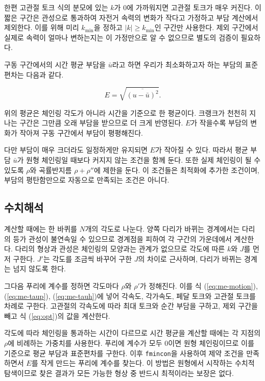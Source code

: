 한편 고관절 토크 식의 분모에 있는 \(k\)가 0에 가까워지면 고관절 토크가 매우 커진다. 이 짧은 구간은 관성으로 통과하여 자전거 속력의 변화가 작다고 가정하고 부담 계산에서 제외한다. 이를 위해 미리 \(k_{\min}\)을 정하고 \(|k|\geq k_{\min}\)인 구간만 사용한다. 제외 구간에서 실제로 속력이 얼마나 변하는지는 이 가정만으로 알 수 없으므로 별도의 검증이 필요하다.

구동 구간에서의 시간 평균 부담을 \(\bar{u}\)라고 하면 우리가 최소화하고자 하는 부담의 표준편차는 다음과 같다.

\begin{equation}
E=\sqrt{\overline{(u-\bar{u})^2}}.
\label{eq:opt}
\end{equation}

위의 평균은 체인링 각도가 아니라 시간을 기준으로 한 평균이다. 크랭크가 천천히 지나는 구간은 그만큼 오래 부담을 받으므로 더 크게 반영된다. \(E\)가 작을수록 부담의 변화가 작아져 구동 구간에서 부담이 평평해진다.

다만 부담이 매우 크더라도 일정하게만 유지되면 \(E\)가 작아질 수 있다. 따라서 평균 부담 \(\bar{u}\)가 원형 체인링일 때보다 커지지 않는 조건을 함께 둔다. 또한 실제 체인링이 될 수 있도록 \(\rho\)와 곡률반지름 \(\rho+\rho''\)에 제한을 둔다. 이 조건들은 최적화에 추가한 조건이며, 부담의 평탄함만으로 자동으로 만족되는 조건은 아니다.


\subsection{수치해석}

계산할 때에는 한 바퀴를 \(N\)개의 각도로 나눈다. 양쪽 다리가 바뀌는 경계에서는 다리의 등가 관성이 불연속일 수 있으므로 경계점을 피하여 각 구간의 가운데에서 계산한다. 다리의 형상과 관성은 체인링의 모양과는 관계가 없으므로 각도에 따른 \(k\)와 \(J\)를 먼저 구한다. \(J'\)는 각도를 조금씩 바꾸어 구한 \(J\)의 차이로 근사하며, 다리가 바뀌는 경계는 넘지 않도록 한다.

그다음 푸리에 계수를 정하면 각도마다 \(\rho\)와 \(\rho'\)가 정해진다. 이를 식 (\ref{eq:me-motion}), (\ref{eq:me-taup}), (\ref{eq:me-tauh})에 넣어 각속도, 각가속도, 페달 토크와 고관절 토크를 차례로 구한다. 고관절의 각속도에 따라 최대 토크와 순간 부담을 구하고, 제외 구간을 빼고 식 (\ref{eq:opt})의 값을 계산한다.

각도에 따라 체인링을 통과하는 시간이 다르므로 시간 평균을 계산할 때에는 각 지점의 \(\rho\)에 비례하는 가중치를 사용한다. 푸리에 계수가 모두 0이면 원형 체인링이므로 이를 기준으로 평균 부담과 표준편차를 구한다. 이후 \texttt{fmincon}을 사용하여 제약 조건을 만족하면서 \(E\)를 작게 만드는 푸리에 계수를 찾는다. 이 방법은 원형에서 시작하는 수치적 탐색이므로 찾은 결과가 모든 가능한 형상 중 반드시 최적이라는 보장은 없다.
